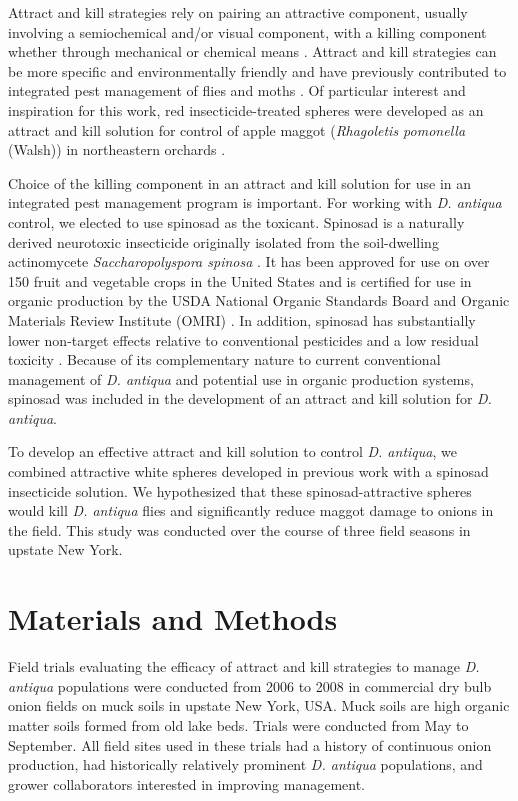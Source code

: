 \documentclass[num-refs]{wiley-article}
\begin{document}
Attract and kill strategies rely on pairing an attractive component, usually involving a semiochemical and/or visual component, with a killing component whether through mechanical or chemical means \citep{gregg2018advances}.  Attract and kill strategies can be more specific and environmentally friendly and have previously contributed to integrated pest management of flies and moths \citep{gregg2018advances}.  Of particular interest and inspiration for this work, red insecticide-treated spheres were developed as an attract and kill solution for control of apple maggot (\textit{Rhagoletis pomonella} (Walsh)) in northeastern orchards \citep{bostanian2001attract,duan1995control}.  

Choice of the killing component in an attract and kill solution for use in an integrated pest management program is important. For working with \textit{D. antiqua} control, we elected to use spinosad as the toxicant. Spinosad is a naturally derived neurotoxic insecticide originally isolated from the soil-dwelling actinomycete \textit{Saccharopolyspora spinosa} \citep{racke2007reduced}. It has been approved for use on over 150 fruit and vegetable crops in the United States and is certified for use in organic production by the USDA National Organic Standards Board and Organic Materials Review Institute (OMRI) \citep{racke2007reduced,williams2003naturally}. In addition, spinosad has substantially lower non-target effects relative to conventional pesticides and a low residual toxicity \citep{williams2003naturally}. Because of its complementary nature to current conventional management of \textit{D. antiqua} and potential use in organic production systems, spinosad was included in the development of an attract and kill solution for \textit{D. antiqua}.

To develop an effective attract and kill solution to control \textit{D. antiqua}, we combined attractive white spheres developed in previous work \citep{willett2019} with a spinosad insecticide solution. We hypothesized that these spinosad-attractive spheres would kill \textit{D. antiqua} flies and significantly reduce maggot damage to onions in the field. This study was conducted over the course of three field seasons in upstate New York.

\section{Materials and Methods}

Field trials evaluating the efficacy of attract and kill strategies to manage \textit{D. antiqua} populations were conducted from 2006 to 2008 in commercial dry bulb onion fields on muck soils in upstate New York, USA.  Muck soils are high organic matter soils formed from old lake beds.  Trials were conducted from May to September.  All field sites used in these trials had a history of continuous onion production, had historically relatively prominent \textit{D. antiqua} populations, and grower collaborators interested in improving management.  
\end{document}
